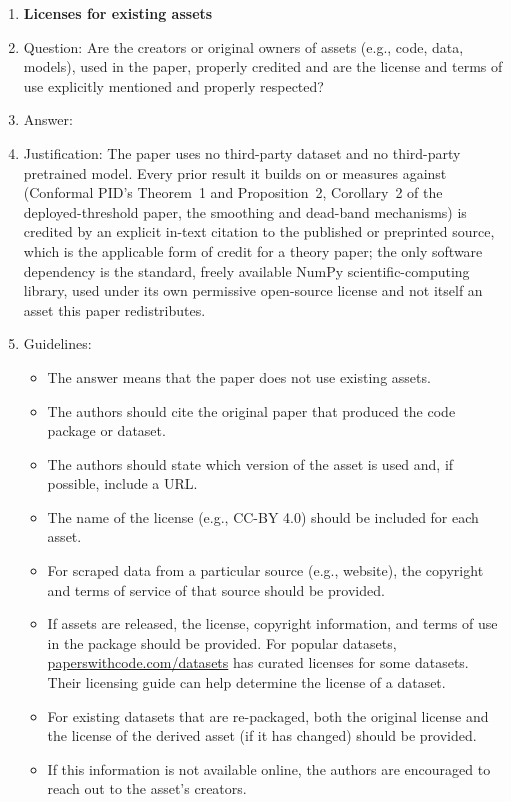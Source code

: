 \begin{enumerate}
\item {\bf Licenses for existing assets}
    \item[] Question: Are the creators or original owners of assets (e.g., code, data, models), used in the paper, properly credited and are the license and terms of use explicitly mentioned and properly respected?
    \item[] Answer: \answerNA{}
    \item[] Justification: The paper uses no third-party dataset and no third-party pretrained model. Every prior result it builds on or measures against (Conformal PID's Theorem~1 and Proposition~2, Corollary~2 of the deployed-threshold paper, the smoothing and dead-band mechanisms) is credited by an explicit in-text citation to the published or preprinted source, which is the applicable form of credit for a theory paper; the only software dependency is the standard, freely available NumPy scientific-computing library, used under its own permissive open-source license and not itself an asset this paper redistributes.
    \item[] Guidelines:
    \begin{itemize}
        \item The answer \answerNA{} means that the paper does not use existing assets.
        \item The authors should cite the original paper that produced the code package or dataset.
        \item The authors should state which version of the asset is used and, if possible, include a URL.
        \item The name of the license (e.g., CC-BY 4.0) should be included for each asset.
        \item For scraped data from a particular source (e.g., website), the copyright and terms of service of that source should be provided.
        \item If assets are released, the license, copyright information, and terms of use in the package should be provided. For popular datasets, \url{paperswithcode.com/datasets} has curated licenses for some datasets. Their licensing guide can help determine the license of a dataset.
        \item For existing datasets that are re-packaged, both the original license and the license of the derived asset (if it has changed) should be provided.
        \item If this information is not available online, the authors are encouraged to reach out to the asset's creators.
    \end{itemize}


\end{enumerate}
